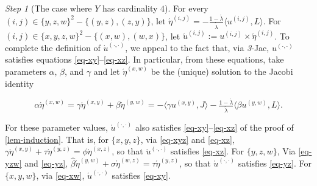 \documentclass[ecta,nameyear,draft]{econsocart}
\makeatletter
\newcommand{\bs}{-}%
\newcommand\mpplus{\text{\srcsize$+\mkern-2mu+$}}
\newcommand{\mbbt}{{\mathds {T}}}
\renewcommand{\ij}{{(i, j)}}
\newcommand{\xy}{{(x, y)}}
\newcommand{\yz}{{(y,z)}}
\newcommand{\xz}{{(x,z)}}
\newcommand{\xw}{{(x,w)}}
\newcommand{\yw}{{(y,w)}}
\newcommand{\zw}{(z,w)}
\newcommand{\wz}{(w,z)}
\newcommand{\dd}{{(\cdot,\cdot)}}
\newcommand{\threejac}{\textup{\textit{3}-Jac}}
\newcommand{\srcsize}{\@setfontsize{\srcsize}{3pt}{3pt}}
\theoremstyle{plain}
\theoremstyle{remark}
\newtheorem{step}{Step}[section]
\makeatother
\begin{document}
\begin{appendix}
\begin{step}[The case where $Y$ has cardinality $4$]


    For every $(i, j) \in \{y,z,w\}^2 \bs \{(y, z), (z, y)\}$, let
    $\acute{\eta}^{\ij} = - \frac{1 - \acute{\lambda}}{\acute{\lambda}} \langle
    u^{\ij}, L \rangle$.  For $(i, j) \in \{x, y , z, w\}^2 \bs \{(x, w), (w,
    x)\}$, let $\acute{u}^{\ij}:= u^{\ij} \times \acute{\eta}^{\ij}$.  To
    complete the definition of $\acute{u}^{\dd}$, we appeal to the fact that, via
    \threejac, $u^{\dd}$ satisfies equations \eqref{eq-xy}--\eqref{eq-xz}. In
    particular, from these equations, take parameters $\alpha$, $\beta$, and
    $\gamma$ and let $\acute{\eta}^{\xw}$ be the (unique) solution to the Jacobi
    identity
    \begin{linenomath*}
      \begin{equation}\label{eq-xw}
        \alpha \acute{\eta}^{\xw} = \gamma \acute{\eta}^{\xy} + \beta
        \acute{\eta}^{\yw} = -\langle \gamma u^{\xy} , J \rangle -
        \tfrac{1-\acute{\lambda}}{\acute{\lambda}}\langle\beta u^{\yw}, L
        \rangle.
      \end{equation}
    \end{linenomath*}
    For these parameter values, $\acute{u}^{\dd}$ also satisfies
    \eqref{eq-xy}--\eqref{eq-xz} of the proof of \cref{lem-induction}. That is,
    for $\{x,y,z\}$, via \cref{eq-xyz} and \eqref{eq-xz}, $\gamma
    \acute{\eta}^{\xy}+\tau \acute{\eta}^{\yz} = \phi \acute{\eta}^{\xz}$, so
    that $\acute{u}^{\dd}$ satisfies \eqref{eq-xz}. For $\{y,z,w\}$, Via
    \cref{eq-yzw} and \eqref{eq-yz}, $\hat{\beta} \acute{\eta}^{\yw}+\sigma
    \acute{\eta}^{\wz} = \tau \acute{\eta}^{\yz}$, so that $\acute{u}^{\dd}$
    satisfies \eqref{eq-yz}. For $\{x,y,w\}$, via \cref{eq-xw}, $\acute{u}^{\dd}$
    satisfies \eqref{eq-xy}.


\end{step}
\end{appendix}
\end{document}
